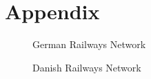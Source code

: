\newpage

\section{Appendix}


\begin{figure}[h!t]
\centering
    


    \caption{German Railways Network}
    \label{fig:de_net}
\end{figure}




\begin{figure}[h!t]
\centering



    \caption{Danish Railways Network}
    \label{fig:dk_net}
\end{figure}





\newpage